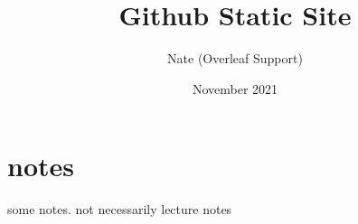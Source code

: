 \documentclass{article}
\title{Github Static Site}
\author{Nate (Overleaf Support)}
\date{November 2021}
\begin{document}
\maketitle

\section{notes}

some notes. not necessarily lecture notes
\end{document}

